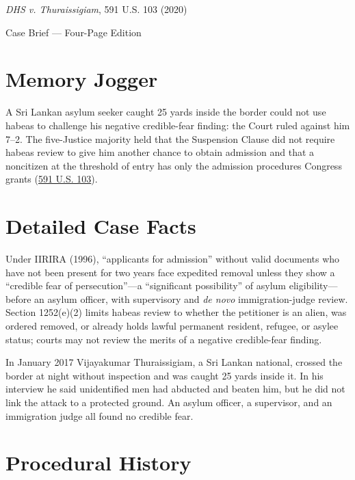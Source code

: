 \documentclass[12pt]{article}
\begin{document}
\begin{center}
{\LARGE \textit{DHS v. Thuraissigiam}, 591 U.S. 103 (2020)\par}
\vspace{0.8em}
{\large Case Brief --- Four-Page Edition\par}
\end{center}
\vspace{1em}

\section{Memory Jogger}

A Sri Lankan asylum seeker caught 25 yards inside the border could not use habeas to challenge his negative credible-fear finding: the Court ruled against him 7--2. The five-Justice majority held that the Suspension Clause did not require habeas review to give him another chance to obtain admission and that a noncitizen at the threshold of entry has only the admission procedures Congress grants (\href{https://supreme.justia.com/cases/federal/us/591/19-161/}{591 U.S. 103}).

\section{Detailed Case Facts}

Under IIRIRA (1996), ``applicants for admission'' without valid documents who have not been present for two years face expedited removal unless they show a ``credible fear of persecution''---a ``significant possibility'' of asylum eligibility---before an asylum officer, with supervisory and \textit{de novo} immigration-judge review. Section 1252(e)(2) limits habeas review to whether the petitioner is an alien, was ordered removed, or already holds lawful permanent resident, refugee, or asylee status; courts may not review the merits of a negative credible-fear finding.

In January 2017 Vijayakumar Thuraissigiam, a Sri Lankan national, crossed the border at night without inspection and was caught 25 yards inside it. In his interview he said unidentified men had abducted and beaten him, but he did not link the attack to a protected ground. An asylum officer, a supervisor, and an immigration judge all found no credible fear.

\section{Procedural History}
\end{document}
